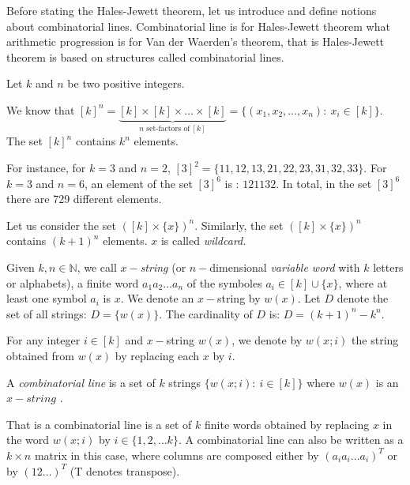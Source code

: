 Before stating the Hales-Jewett theorem, let us introduce and define notions about combinatorial lines.  Combinatorial line is for Hales-Jewett theorem what arithmetic progression is for Van der Waerden's theorem, that is Hales-Jewett theorem is based on structures called combinatorial lines.

Let $k$ and $n$  be two positive integers. 

We know that $[k]^n= \underbrace{[k] \times [k] \times \ldots \times [k]}_{n \text{ set-factors  of}\  [k]}=\{(x_1,x_2,\ldots, x_n):\ x_i \in [k] \}.$ The set $[k]^n$ contains $k^n$ elements.

For instance, for $k=3$ and $n=2$, $[3]^2=\{11,12,13,21,22,23,31,32,33\}.$ For $k=3$ and $n=6$, an element of the set $[3]^6$ is : $121132.$ In total, in the set $[3]^6$ there are  729 different elements.

Let us consider the set $([k]\times \{x\})^n.$ Similarly, the set $([k]\times \{x\})^n$ contains $(k+1)^n$ elements. $x$ is called \textit{wildcard.}



Given ${k,n\in{\mathbb N}}$, we call $x-$\textit{string} (or ${n}-$dimensional \textit{variable word} with ${k}$ letters or alphabets),  a finite word $a_1a_2\ldots a_n$ of the symboles $a_i \in [k] \cup \{x\}$, where at least one symbol $a_i$ is $x.$ We denote an $x-$string by $w(x)$. Let $D$ denote  the set of all strings: $D=\{w(x)\}$. The cardinality of $D$ is: $D=(k+1)^n-k^n.$ 

For any integer $i \in [k]$ and $x-$string $w(x)$, we  denote by $w(x;i)$ the string obtained from $w(x)$ by replacing each $x$ by $i.$
 \begin{defn}
A \textit{combinatorial line} is a set of $k$ strings $\{w(x;i): \  i\in [k] \}$ where $w(x)$ is an $x-string$ %
.\end{defn}
 That is a combinatorial line is a set of $k$ finite words obtained by replacing $x$ in the word $w(x;i)$ by $i \in \{1,2, \ldots k\}.$ A combinatorial line can also be written as a $k \times n$ matrix in this case, where columns are composed either by $(a_ia_i\ldots a_i)^T$ or by  $(12\ldots )^T$ (T denotes transpose).

